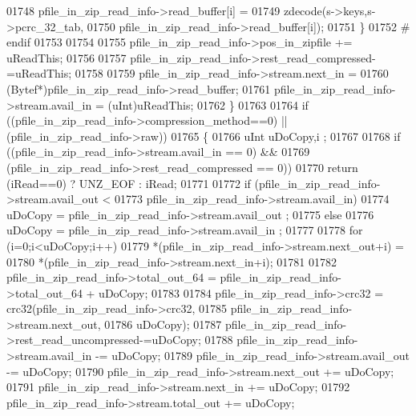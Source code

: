 \begin{DoxyCode}
01748                   pfile\_in\_zip\_read\_info->read\_buffer[i] =
01749                       zdecode(s->keys,s->pcrc\_32\_tab,
01750                               pfile\_in\_zip\_read\_info->read\_buffer[i]);
01751             \}
01752 \textcolor{preprocessor}{#            endif}
01753 
01754 
01755             pfile\_in\_zip\_read\_info->pos\_in\_zipfile += uReadThis;
01756 
01757             pfile\_in\_zip\_read\_info->rest\_read\_compressed-=uReadThis;
01758 
01759             pfile\_in\_zip\_read\_info->stream.next\_in =
01760                 (Bytef*)pfile\_in\_zip\_read\_info->read\_buffer;
01761             pfile\_in\_zip\_read\_info->stream.avail\_in = (uInt)uReadThis;
01762         \}
01763 
01764         \textcolor{keywordflow}{if} ((pfile\_in\_zip\_read\_info->compression\_method==0) || (pfile\_in\_zip\_read\_info->raw))
01765         \{
01766             uInt uDoCopy,i ;
01767 
01768             \textcolor{keywordflow}{if} ((pfile\_in\_zip\_read\_info->stream.avail\_in == 0) &&
01769                 (pfile\_in\_zip\_read\_info->rest\_read\_compressed == 0))
01770                 \textcolor{keywordflow}{return} (iRead==0) ? UNZ\_EOF : iRead;
01771 
01772             \textcolor{keywordflow}{if} (pfile\_in\_zip\_read\_info->stream.avail\_out <
01773                             pfile\_in\_zip\_read\_info->stream.avail\_in)
01774                 uDoCopy = pfile\_in\_zip\_read\_info->stream.avail\_out ;
01775             \textcolor{keywordflow}{else}
01776                 uDoCopy = pfile\_in\_zip\_read\_info->stream.avail\_in ;
01777 
01778             \textcolor{keywordflow}{for} (i=0;i<uDoCopy;i++)
01779                 *(pfile\_in\_zip\_read\_info->stream.next\_out+i) =
01780                         *(pfile\_in\_zip\_read\_info->stream.next\_in+i);
01781 
01782             pfile\_in\_zip\_read\_info->total\_out\_64 = pfile\_in\_zip\_read\_info->total\_out\_64 + uDoCopy;
01783 
01784             pfile\_in\_zip\_read\_info->crc32 = crc32(pfile\_in\_zip\_read\_info->crc32,
01785                                 pfile\_in\_zip\_read\_info->stream.next\_out,
01786                                 uDoCopy);
01787             pfile\_in\_zip\_read\_info->rest\_read\_uncompressed-=uDoCopy;
01788             pfile\_in\_zip\_read\_info->stream.avail\_in -= uDoCopy;
01789             pfile\_in\_zip\_read\_info->stream.avail\_out -= uDoCopy;
01790             pfile\_in\_zip\_read\_info->stream.next\_out += uDoCopy;
01791             pfile\_in\_zip\_read\_info->stream.next\_in += uDoCopy;
01792             pfile\_in\_zip\_read\_info->stream.total\_out += uDoCopy;

\end{DoxyCode}
